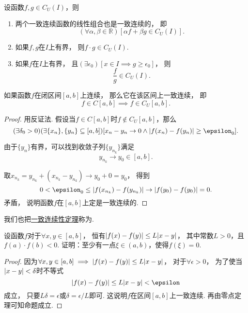 \begin{theorem}[一致连续函数的四则运算法则]\label{theorem:极限.闭区间上连续函数的性质.一致连续函数的四则运算法则}
设函数\(f,g \in C_U(I)\)，则
\begin{enumerate}
	\item 两个一致连续函数的线性组合也是一致连续的，
	即\[
		(\forall\alpha,\beta\in\mathbb{R})
		[\alpha f + \beta g \in C_U(I)].
	\]

	\item 如果\(f,g\)在\(I\)上有界，
	则\(f \cdot g \in C_U(I)\).

	\item 如果\(f\)在\(I\)上有界，
	且\((\exists\epsilon_0)
	[x \in I \implies g \geq \epsilon_0]\)，
	则\[
		\frac{f}{g} \in C_U(I).
	\]
\end{enumerate}
\end{theorem}

\begin{theorem}[一致连续性定理]\label{theorem:极限.一致连续性定理}
如果函数\(f\)在闭区间\([a,b]\)上连续，
那么它在该区间上一致连续，
即\[
	f \in C[a,b]
	\implies
	f \in C_U[a,b].
\]
\begin{proof}
用反证法.
假设当\(f \in C[a,b]\)时\(f \notin C_U[a,b]\)，那么\[
	(\exists\delta_0>0)
	(\exists\{x_n\},\{y_n\}\subseteq[a,b])
	[
		x_n-y_n\to0
		\land
		\abs{f(x_n)-f(y_n)}\geq\epsilon_0
	].
\]

由于\(\{y_n\}\)有界，可以找到收敛子列\(\{y_{n_k}\}\)满足\[
	y_{n_k} \to y_0\in[a,b].
\]

取\(x_{n_k} = y_{n_k} + (x_{n_k} - y_{n_k})
\to y_0 + 0 = y_0\)，
得到\[
	0 < \epsilon_0 \leq \abs{f(x_{n_k})-f(y_{n_k})}
	\to \abs{f(y_0)-f(y_0)} = 0.
\]矛盾，
说明函数\(f\)在\([a,b]\)上定是一致连续的.
\end{proof}
\end{theorem}
我们也把\hyperref[theorem:极限.一致连续性定理]{一致连续性定理}称为.

\begin{example}
设函数\(f\)对于\(\forall x,y \in [a,b]\)，
恒有\(\abs{f(x) - f(y)} \leq L \abs{x - y}\)，
其中常数\(L > 0\)，且\(f(a) \cdot f(b) < 0\).
证明：至少有一点\(\xi \in (a,b)\)，使得\(f(\xi) = 0\).
\begin{proof}
因为\(\forall x,y \in [a,b] \implies \abs{f(x) - f(y)} \leq L \abs{x - y}\)，
对于\(\forall \epsilon > 0\)，
为了使当\(\abs{x - y} < \delta\)时不等式\[
\abs{f(x) - f(y)} \leq L \abs{x - y} < \epsilon
\]成立，
只要\(L \delta = \epsilon\)或\(\delta = \epsilon / L\)即可.
这说明\(f\)在区间\([a,b]\)上一致连续.
再由零点定理可知命题成立.
\end{proof}
\end{example}

